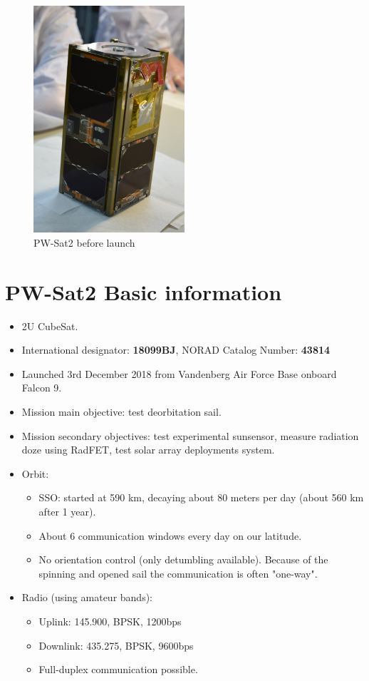 
\begin{figure}
	\centering
	\includegraphics[width=0.5\textwidth]{img/pw-sat.jpg}
	\caption{\label{fig:basic:pw-sat} PW-Sat2 before launch}
\end{figure}

\section{PW-Sat2 Basic information}



\begin{itemize}
 \item 2U CubeSat.
 \item International designator: \textbf{18099BJ}, NORAD Catalog Number: \textbf{43814}
 \item Launched 3rd December 2018 from Vandenberg Air Force Base onboard Falcon 9.
 \item Mission main objective: test deorbitation sail.
 \item Mission secondary objectives: test experimental sunsensor, measure radiation doze using RadFET, test solar array deployments system.
 \item Orbit:
 \begin{itemize}
	\item SSO: started at 590 km, decaying about 80 meters per day (about 560 km after 1 year).
	\item About 6 communication windows every day on our latitude. 
	\item No orientation control (only detumbling available). Because of the spinning and opened sail the communication is often "one-way".	
 \end{itemize}
 \item Radio (using amateur bands):
 \begin{itemize}         
	\item Uplink: 145.900, BPSK, 1200bps
    \item Downlink: 435.275, BPSK, 9600bps 
    \item Full-duplex communication possible.
 \end{itemize}
\end{itemize}